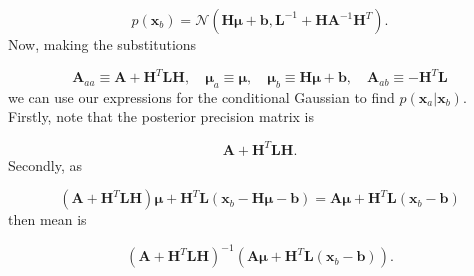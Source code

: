\documentclass[a4paper, 11pt]{article}
\begin{document}
\begin{equation}
p(\boldsymbol{x}_b) = \mathcal{N}(\boldsymbol{H\mu}+\boldsymbol{b}, \boldsymbol{L}^{-1} + \boldsymbol{HA}^{-1}\boldsymbol{H}^T).
\end{equation}
Now, making the substitutions

\begin{equation}
\boldsymbol{A}_{aa} \equiv \boldsymbol{A} + \boldsymbol{H}^T\boldsymbol{LH}, \quad \boldsymbol{\mu}_a \equiv \boldsymbol{\mu}, \quad \boldsymbol{\mu}_b \equiv \boldsymbol{H\mu} + \boldsymbol{b}, \quad \boldsymbol{A}_{ab} \equiv -\boldsymbol{H}^T\boldsymbol{L}
\end{equation}
we can use our expressions for the conditional Gaussian to find $p(\boldsymbol{x}_a|\boldsymbol{x}_b)$. Firstly, note that the posterior precision matrix is

\begin{equation}
\boldsymbol{A} + \boldsymbol{H}^T\boldsymbol{LH}.
\end{equation}
Secondly, as

\begin{equation}
(\boldsymbol{A}+\boldsymbol{H}^T\boldsymbol{LH})\boldsymbol{\mu} + \boldsymbol{H}^T\boldsymbol{L}(\boldsymbol{x}_b-\boldsymbol{H\mu} - \boldsymbol{b}) = \boldsymbol{A\mu} + \boldsymbol{H}^T\boldsymbol{L}(\boldsymbol{x}_b-\boldsymbol{b})
\end{equation}
then mean is

\begin{equation}
( \boldsymbol{A} + \boldsymbol{H}^T\boldsymbol{LH} )^{-1} \left(  \boldsymbol{A\mu} + \boldsymbol{H}^T\boldsymbol{L}(\boldsymbol{x}_b-\boldsymbol{b}) \right).
\end{equation}





\end{document}
